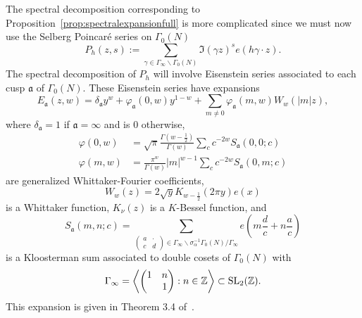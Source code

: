 The spectral decomposition corresponding to Proposition~\ref{prop:spectralexpansionfull}
is more complicated since we must now use the Selberg Poincar\'{e} series on $\Gamma_0(N)$
\begin{equation}
  P_h(z,s) := \sum_{\gamma \in \Gamma_\infty \backslash \Gamma_0(N)} \Im(\gamma z)^s
  e(h\gamma \cdot z).
\end{equation}
The spectral decomposition of $P_h$ will involve Eisenstein series associated to each cusp
$\mathfrak{a}$ of $\Gamma_0(N)$.
These Eisenstein series have expansions
\begin{equation}
  E_\mathfrak{a} (z,w) = \delta_\mathfrak{a} y^w + \varphi_\mathfrak{a}(0,w) y^{1-w} +
  \sum_{m \neq 0} \varphi_\mathfrak{a} (m,w) W_w(\lvert m\rvert z),
\end{equation}
where $\delta_\mathfrak{a} = 1$ if $\mathfrak{a} = \infty$ and is $0$ otherwise,
\begin{align}
  \varphi(0, w) &= \sqrt \pi \frac{\Gamma(w - \frac{1}{2})}{\Gamma(w)} \sum_c
  c^{-2w}S_\mathfrak{a}(0,0;c) \\
  \varphi(m, w) &= \frac{\pi^w}{\Gamma(w)} \lvert m \rvert^{w-1} \sum_c c^{-2w}
  S_\mathfrak{a}(0, m; c)
\end{align}
are generalized Whittaker-Fourier coefficients,
\begin{equation}
  W_w(z) = 2\sqrt y K_{w - \frac{1}{2}}(2\pi y) e(x)
\end{equation}
is a Whittaker function, $K_\nu(z)$ is a $K$-Bessel function, and
\begin{equation}
  S_\mathfrak{a}(m,n; c) = \sum_{\left(\begin{smallmatrix} a&\cdot \\ c&d
  \end{smallmatrix}\right) \in \Gamma_\infty \backslash \sigma_\alpha^{-1} \Gamma_0(N) /
  \Gamma_\infty} e\left( m \frac{d}{c} + n \frac{a}{c}\right)
\end{equation}
is a Kloosterman sum associated to double cosets of $\Gamma_0(N)$ with
\begin{equation}
  \Gamma_\infty = \left \langle \begin{pmatrix} 1&n \\ &1 \end{pmatrix} : n \in \mathbb{Z}
\right\rangle \subset \operatorname{SL}_2(\mathbb{Z}).
\end{equation}
This expansion is given in Theorem 3.4 of~\cite{iwaniec2002spectral}.



